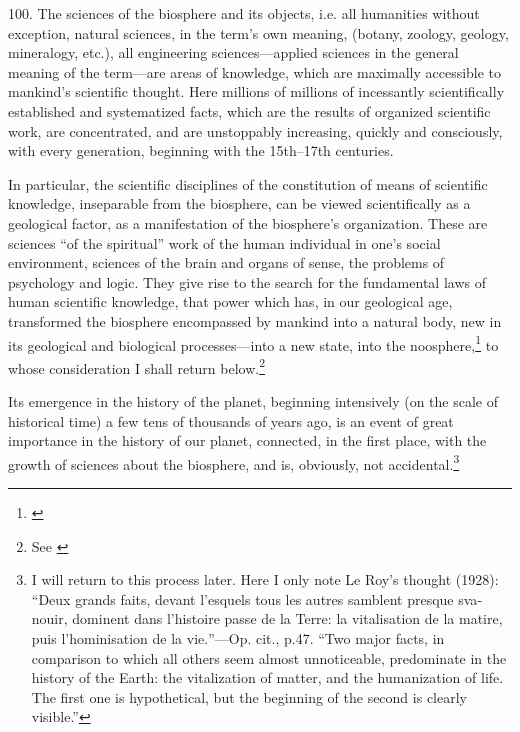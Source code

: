 
100. The sciences of the biosphere and its objects, i.e. all humanities
without exception, natural sciences, in the term's own meaning, (botany,
zoology, geology, mineralogy, etc.), all engineering sciences---applied
sciences in the general meaning of the term---are areas of knowledge, which are
maximally accessible to mankind's scientific thought.  Here millions of
millions of incessantly scientifically established and systematized facts,
which are the results of organized scientific work, are concentrated, and are
unstoppably increasing, quickly and consciously, with every generation,
beginning with the 15th--17th centuries.

In particular, the scientific disciplines of the constitution of means of
scientific knowledge, inseparable from the biosphere, can be viewed
scientifically as a geological factor, as a manifestation of the biosphere's
organization.  These are sciences ``of the spiritual'' work of the human
individual in one's social environment, sciences of the brain and organs of
sense, the problems of psychology and logic.  They give rise to the search for
the fundamental laws of human scientific knowledge, that power which has, in
our geological age, transformed the biosphere encompassed by mankind into a
natural body, new in its geological and biological processes---into a new
state, into the noosphere,\footnote{
	\foreignlanguage{french}{}
} to whose consideration I shall return below.\footnote{
	See \foreignlanguage{russian}{\cite[Гл.~21]{vernadsky1987himicheskoe}}}

Its emergence in the history of the planet, beginning intensively (on the
scale of historical time) a few tens of thousands of years ago, is an event of
great importance in the history of our planet, connected, in the first place,
with the growth of sciences about the biosphere, and is, obviously, not
accidental.\footnote{
	I will return to this process later.  Here I only note Le Roy's thought
	(1928): \foreignquote{french}{Deux grands faits, devant l'esquels tous
	les autres samblent presque svanouir, dominent dans l'histoire passe de
	la Terre: la vitalisation de la matire, puis l'hominisation de la
	vie.}---Op. cit., p.47.  \enquote{Two major facts, in comparison to
	which all others seem almost unnoticeable, predominate in the history
	of the Earth: the vitalization of matter, and the humanization of life.
	The first one is hypothetical, but the beginning of the second is
	clearly visible.}}

